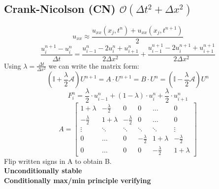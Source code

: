 \subsection{Crank-Nicolson (CN) \texorpdfstring{\hfill $\mathcal{O}(\Delta t^2 + \Delta x^2)$}{O(t2+x2)}}
    \vspace{-0.5em}
    {\tiny$$
        u_{xx} \approx \frac{u_{xx}\left(x_j,t^n\right) + u_{xx}\left(x_j,t^{n+1}\right)}{2}
    $$}
    \vspace{-0.5em}
    $$
        \frac{u_i^{n+1}\! -u_i^n}{\Delta t}\! =\! \frac{u_{i-1}^n\! -2u_i^n\! +\! u_{i+1}^n}{2 \Delta x^2}\! +\! \frac{u_{i-1}^{n+1}\! -2u_i^{n+1}\! +u_{i+1}^{n+1}}{2 \Delta x^2} 
    $$
    Using $\lambda = \frac{\Delta t}{\Delta x^2}$ we can write the matrix form:
    $$\!\left(\!\mathbb{I} + \frac{\lambda}{2} \mathcal{A}\!\right) U^{n+1} = \boxed{
        A \cdot U^{n+1} = B \cdot U^n
    } = \!\left(\!\mathbb{I} - \frac{\lambda}{2} \mathcal{A}\!\right) U^{n}\!
    $$
    $$
        F_i^n = \frac{\lambda}{2} \cdot u_{i-1}^n + (1-\lambda) \cdot u_i^n + \frac{\lambda}{2} \cdot u_{i+1}^n
    $$
    $$
        A = 
        \begin{bmatrix}
            1+\lambda & -\frac{\lambda}{2} &  0 & 0 & \dots & 0 \\
            -\frac{\lambda}{2} &  1+\lambda & -\frac{\lambda}{2} & 0 & \dots & 0 \\
            \vdots & \ddots & \ddots & \ddots & \ddots & \vdots \\
            0 & \dots & 0 & -\frac{\lambda}{2} &  1+\lambda & -\frac{\lambda}{2} \\
            0 & \dots & 0 & 0 &  -\frac{\lambda}{2} &  1+\lambda 
        \end{bmatrix}
    $$
    Flip written signs in A to obtain B.\\
    \textbf{Unconditionally stable}\\
    \textbf{Conditionally max/min principle verifying}